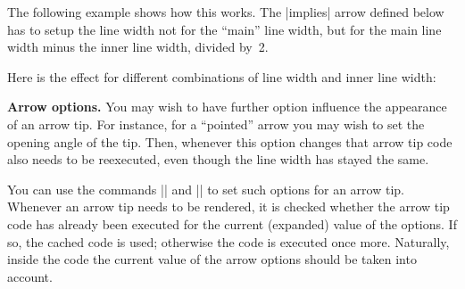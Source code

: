 \begin{command}{\pgfarrowsdeclare{}}
  The following example shows how this works. The |implies| arrow
  defined below has to setup the line width not for the ``main'' line
  width, but for the main line width minus the inner line width,
  divided by~2.
\begin{codeexample}
{
  \pgfsetlinewidth{\pgfutil@tempdimb}
  \pgfsetdash{}{0pt}
  \pgfsetroundcap
  \pgfsetroundjoin
                 {}
                 {}
                 {}
                 {}
  \pgfusepathqstroke
}
\end{codeexample}
  Here is the effect for different combinations of line width and
  inner line width:
\begin{codeexample}[]
\end{codeexample}

  \medskip
  \textbf{Arrow options.}
  You may wish to have further option influence the appearance of an
  arrow tip. For instance, for a ``pointed'' arrow you may wish to set
  the opening angle of the tip. Then, whenever this option changes
  that arrow tip code also needs to be reexecuted, even though the
  line width has stayed the same.

  You can use the commands |\pgfsetarrowoptions| and
  |\pgfgetarrowoptions| to set such options for an arrow tip. Whenever
  an arrow tip needs to be rendered, it is checked whether the arrow
  tip code has already been executed for the current (expanded) value of the
  options. If so, the cached code is used; otherwise the code is
  executed once more. Naturally, inside the code the current value of
  the arrow options should be taken into account.


\end{command}
